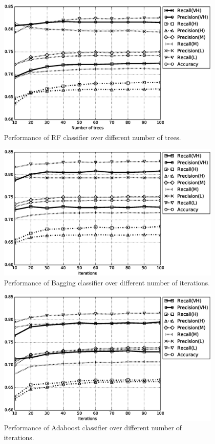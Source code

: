 \documentclass[a4paper,10pt,twocolumn,preprint,3p]{elsarticle}
\begin{document}
\begin{figure}

\centerline{\includegraphics[scale=0.46]{RF}}

\caption{Performance of RF classifier over different number of trees.}
\label{fig:PerformanceRF}
\end{figure}

\begin{figure}
\centerline{
\includegraphics[scale=0.46]{Bagging}}

\caption{Performance of Bagging classifier over different number of iterations.}
\label{fig:PerformanceBagging}
\end{figure}

\begin{figure}
\centerline{
\includegraphics[scale=0.46]{Adaboost}
}
\caption{Performance of Adaboost classifier over different number of iterations.}
\label{fig:PerformanceAdaboost}
\end{figure}
\end{document}
